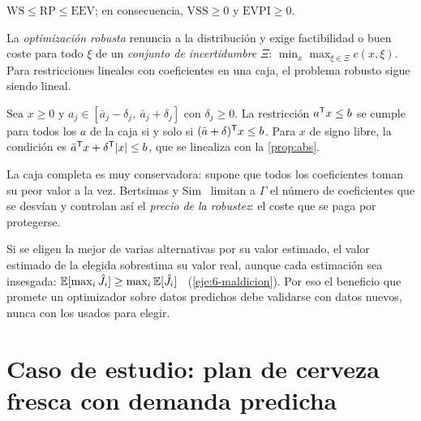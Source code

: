 \begin{proposicion}\label{prop:vss}
$\mathrm{WS}\le\mathrm{RP}\le\mathrm{EEV}$; en consecuencia, $\mathrm{VSS}\ge 0$ y $\mathrm{EVPI}\ge 0$.
\end{proposicion}

La \emph{optimización robusta} renuncia a la distribución y exige factibilidad o buen coste para todo $\xi$ de un \emph{conjunto de incertidumbre} $\Xi$: $\min_x\max_{\xi\in\Xi}c(x,\xi)$. Para restricciones lineales con coeficientes en una caja, el problema robusto sigue siendo lineal.

\begin{proposicion}\label{prop:robusta}
Sea $x\ge 0$ y $a_j\in[\bar a_j-\delta_j,\ \bar a_j+\delta_j]$ con $\delta_j\ge 0$. La restricción $a^{\mathsf{T}} x\le b$ se cumple para todos los $a$ de la caja si y solo si $(\bar a+\delta)^{\mathsf{T}} x\le b$. Para $x$ de signo libre, la condición es $\bar a^{\mathsf{T}} x+\delta^{\mathsf{T}}\lvert x\rvert\le b$, que se linealiza con la \cref{prop:abs}.
\end{proposicion}

La caja completa es muy conservadora: supone que todos los coeficientes toman su peor valor a la vez. Bertsimas y Sim~\cite{bsim} limitan a $\Gamma$ el número de coeficientes que se desvían y controlan así el \emph{precio de la robustez}: el coste que se paga por protegerse.

\begin{observacion}\label{obs:maldicion}
Si se eligen la mejor de varias alternativas por su valor estimado, el valor estimado de la elegida sobrestima su valor real, aunque cada estimación sea insesgada: $\mathbb{E}[\max_i\hat J_i]\ge\max_i\mathbb{E}[\hat J_i]$~\cite{smith} (\cref{eje:6-maldicion}). Por eso el beneficio que promete un optimizador sobre datos predichos debe validarse con datos nuevos, nunca con los usados para elegir.
\end{observacion}

\section{Caso de estudio: plan de cerveza fresca con demanda predicha}

\addtocounter{definicion}{1}%

